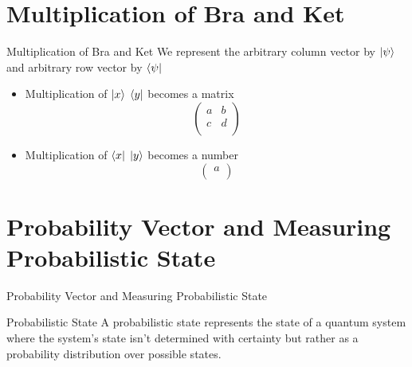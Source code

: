 \documentclass[12pt, aspectratio=169]{beamer}
\begin{document}
\section{Multiplication of Bra and Ket}
\begin{frame}{Multiplication of Bra and Ket}
    We represent the arbitrary column vector by $\ket{\psi}$ and arbitrary row vector by $\bra{\psi}$ \\
    \begin{itemize}
        \item Multiplication of $\ket{x}$ $\bra{y}$ becomes a matrix 
        \[
        \begin{pmatrix}
            a & b \\
            c & d \\
        \end{pmatrix}
        \]
        \item Multiplication of $\bra{x}$ $\ket{y}$ becomes a number 
        \[
        \begin{pmatrix}
            a \\
        \end{pmatrix}
        \]
    \end{itemize}
\end{frame}

\section{Probability Vector and Measuring Probabilistic State}
\begin{frame}{Probability Vector and Measuring Probabilistic State}
    \begin{block}{Probabilistic State}
        A probabilistic state represents the state of a quantum system where the system's state isn't determined with certainty but rather as a probability distribution over possible states.
    \end{block}
\end{frame}
\end{document}
